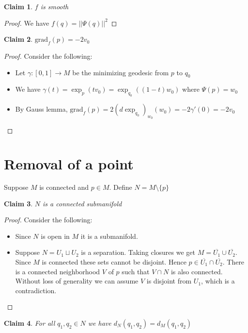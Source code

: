 \documentclass[a4paper,11pt]{article}
\newtheorem{claim}{Claim}
\begin{document}
\begin{claim}
  $f$ is smooth 
\end{claim}

\begin{proof}
  We have $f(q)=||\Psi(q)||^2$
\end{proof}

\begin{claim}
  $\text{grad}_f(p)=-2v_0$
\end{claim}

\begin{proof}
  Consider the following:
  \begin{itemize}
    \item Let $\gamma:[0,1] \to M$ be the minimizing geodesic from $p$ to $q_0$
    \item We have $\gamma(t)=\exp_p(tv_0)=\exp_{q_0}((1-t)w_0)$ where $\Psi(p)=w_0$
    \item By Gauss lemma, $\text{grad}_f(p)=2(d\exp_{q_0})_{w_0}(w_0)=-2\gamma'(0)=-2v_0$ 
  \end{itemize}
\end{proof}

\section{Removal of a point}

Suppose $M$ is connected and $p \in M$. Define $N = M \setminus \{p\}$

\begin{claim}
  $N$ is a connected submanifold
\end{claim}

\begin{proof}
  Consider the following:
  \begin{itemize}
    \item Since $N$ is open in $M$ it is a submanifold.
    \item Suppose $N=U_1 \sqcup U_2$ is a separation. Taking closures we get $M=\overline{U_1} \cup \overline{U_2}$.
          Since $M$ is connected these sets cannot be disjoint. Hence $p \in \overline{U_1} \cap \overline{U_2}$.
          There is a connected neighborhood $V$ of $p$ such that $V \cap N$ is also connected. 
          Without loss of generality we can assume $V$ is disjoint from $U_1$, which is a contradiction.
  \end{itemize}
\end{proof}

\begin{claim}
  For all $q_1,q_2 \in N$ we have $d_N(q_1,q_2)=d_M(q_1,q_2)$
\end{claim}
\end{document}
